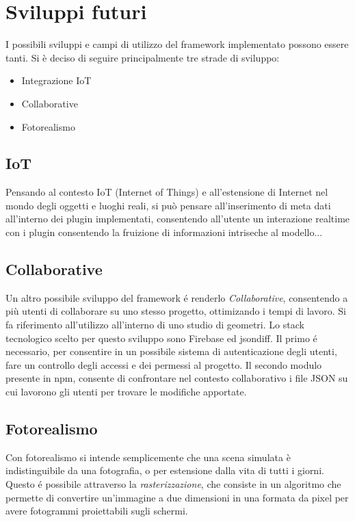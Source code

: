 \section{Sviluppi futuri}
\label{sec:conclusions_section_2}

I possibili sviluppi e campi di utilizzo del framework implementato possono essere tanti.
Si \`e deciso di seguire principalmente tre strade di sviluppo:
\begin{itemize}
\item Integrazione IoT
\item Collaborative
\item Fotorealismo
\end{itemize}
\newpage

\subsection{IoT}
Pensando al contesto IoT (Internet of Things) e all'estensione di Internet nel mondo degli oggetti e luoghi reali,
si può pensare all'inserimento di meta dati all'interno dei plugin implementati,
consentendo all'utente un interazione realtime con i plugin consentendo la fruizione di informazioni
intriseche al modello...

\newpage

\subsection{Collaborative}

Un altro possibile sviluppo del framework \'e renderlo \emph{Collaborative}, consentendo a più utenti
di collaborare su uno stesso progetto, ottimizando i tempi di lavoro. Si fa riferimento
all'utilizzo all'interno di uno studio di geometri. Lo stack tecnologico scelto per questo sviluppo sono
Firebase ed jsondiff. Il primo \'e necessario, per consentire in un possibile sistema di autenticazione degli utenti,
fare un controllo degli accessi e dei permessi al progetto.
Il secondo modulo presente in npm, consente di confrontare nel contesto collaborativo i file JSON su cui lavorono
gli utenti per trovare le modifiche apportate.
\newpage

\subsection{Fotorealismo}
Con fotorealismo si intende semplicemente che una scena simulata \`e indistinguibile da una fotografia, o per estensione
dalla vita di tutti i giorni. Questo \'e possibile attraverso la \emph{rasterizzazione}, che consiste in un algoritmo che
permette di convertire un'immagine a due dimensioni in una formata da pixel per avere fotogrammi proiettabili sugli schermi.

